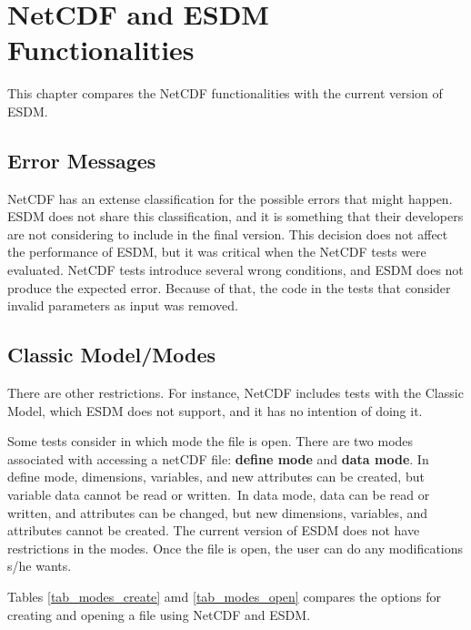 \chapter{NetCDF and ESDM Functionalities}

\tab
This chapter compares the NetCDF functionalities with the current version of ESDM.

\section{Error Messages}

\tab
NetCDF has an extense classification for the possible errors that might happen. ESDM does not share this classification, and it is something that their developers are not considering to include in the final version. This decision does not affect the performance of ESDM, but it was critical when the NetCDF tests were evaluated. NetCDF tests introduce several wrong conditions, and ESDM does not produce the expected error. Because of that, the code in the tests that consider invalid parameters as input was removed.

\section{Classic Model/Modes}

\tab
There are other restrictions. For instance, NetCDF includes tests with the Classic Model, which ESDM does not support, and it has no intention of doing it.

Some tests consider in which mode the file is open. There are two modes associated with accessing a netCDF file: {\bf define mode} and {\bf data mode}. In define mode, dimensions, variables, and new attributes can be created, but variable data cannot be read or written. In data mode, data can be read or written, and attributes can be changed, but new dimensions, variables, and attributes cannot be created. The current version of ESDM does not have restrictions in the modes. Once the file is open, the user can do any modifications s/he wants.

Tables \ref{tab_modes_create} amd \ref{tab_modes_open} compares the options for creating and opening a file using NetCDF and ESDM.

